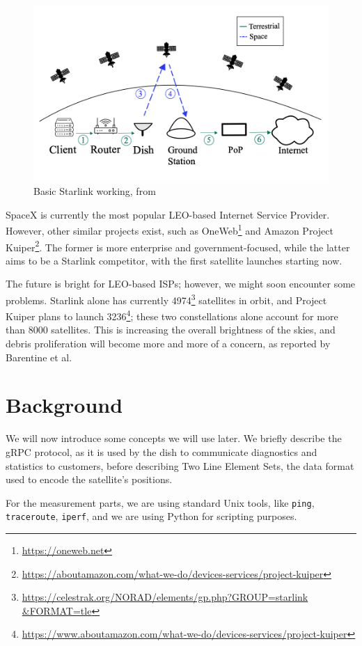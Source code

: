 \documentclass[IN,11pt,twoside,openright,idp,english]{tumthesis}
\begin{document}
\begin{figure}
    \centering
    \includegraphics[width=0.6\columnwidth]{img/starlink-101.png}
    \caption{Basic Starlink working, from \cite{izhikevich2023democratizing}}
    \label{fig:starlink-101}
\end{figure}      
    
SpaceX is currently the most popular LEO-based Internet Service Provider. However, other similar projects exist, such as OneWeb\footnote{\url{https://oneweb.net}} and Amazon Project Kuiper\footnote{\url{https://aboutamazon.com/what-we-do/devices-services/project-kuiper}}. The former is more enterprise and government-focused, while the latter aims to be a Starlink competitor, with the first satellite launches starting now.

The future is bright for LEO-based ISPs; however, we might soon encounter some problems. Starlink alone has currently 4974\footnote{\url{https://celestrak.org/NORAD/elements/gp.php?GROUP=starlink &FORMAT=tle}} satellites in orbit, and Project Kuiper plans to launch 3236\footnote{\url{https://www.aboutamazon.com/what-we-do/devices-services/project-kuiper}}; these two constellations alone account for more than 8000 satellites. This is increasing the overall brightness of the skies, and debris proliferation will become more and more of a concern, as reported by Barentine et al. \cite{cite-key}
    
\section{Background}

We will now introduce some concepts we will use later. We briefly describe the gRPC protocol, as it is used by the dish to communicate diagnostics and statistics to customers, before describing Two Line Element Sets, the data format used to encode the satellite's positions. 

For the measurement parts, we are using standard Unix tools, like \texttt{ping}, \texttt{traceroute}, \texttt{iperf}, and we are using Python for scripting purposes.
\end{document}
